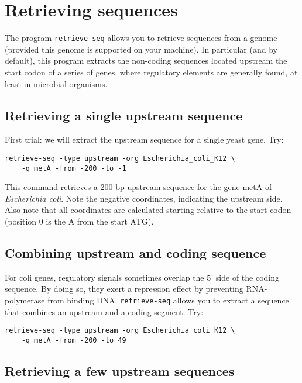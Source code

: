 \chapter{Retrieving sequences}

The program \texttt{retrieve-seq} allows you to retrieve sequences
from a genome (provided this genome is supported on your machine). In
particular (and by default), this program extracts the non-coding
sequences located upstream the start codon of a series of genes, where
regulatory elements are generally found, at least in microbial
organisms.

\section{Retrieving a single upstream sequence}
First trial: we will extract the upstream sequence for a single yeast
gene. Try:

\begin{verbatim}
retrieve-seq -type upstream -org Escherichia_coli_K12 \
    -q metA -from -200 -to -1
\end{verbatim}

This command retrieves a 200 bp upstream sequence for the gene metA of
\textit{Escherichia coli}. Note the negative coordinates, indicating the
upstream side. Also note that all coordinates are calculated starting
relative to the start codon (position 0 is the A from the start ATG).

\section{Combining upstream and coding sequence}
For coli genes, regulatory signals sometimes overlap the 5' side of
the coding sequence. By doing so, they exert a repression effect by
preventing RNA-polymerase from binding DNA. \texttt{retrieve-seq}
allows you to extract a sequence that combines an upstream and a
coding segment. Try:

\begin{verbatim}
retrieve-seq -type upstream -org Escherichia_coli_K12 \
    -q metA -from -200 -to 49
\end{verbatim}

\section{Retrieving a few upstream sequences}

